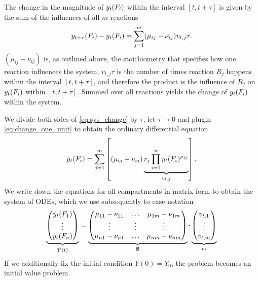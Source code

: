 The change in the magnitude of $y_t(F_i)$ within the interval $[t, t+\tau]$ is given by the sum of the influences of all $m$ reactions
\begin{align}
\label{eq:sys_change}
y_{t+\tau}(F_i) - y_t(F_i) = \sum_{j=1}^m (\mu_{ij} - \nu_{ij}) v_{t,j} \tau.
\end{align}
$(\mu_{ij} - \nu_{ij})$ is, as outlined above, the stoichiometry that specifies how one reaction influences the system, $v_{t,j} \tau$ is the number of times reaction $R_j$ happens within the interval $[t, t+\tau]$, and therefore the product is the influence of $R_j$ on $y_t(F_i)$ within $[t, t+\tau]$. Summed over all reactions yields the change of $y_t(F_i)$ within the system. 

We divide both sides of \eqref{eq:sys_change} by $\tau$, let $\tau \to 0$ and plugin \eqref{eq:change_one_unit} to obtain the ordinary differential equation
\begin{align}
\dot{y}_t(F_i) = \sum_{j=1}^m \left[(\mu_{ij} - \nu_{ij}) \underbrace{r_j  \prod_{i=1}^n y_t(F_i)^{\mu_{ij}}}_{v_{t,j}} \right].
\end{align}
We write down the equations for all compartments in matrix form to obtain the system of ODEs, which we use subsequently to ease notation
\begin{align}
\label{eq:ode_system_matrix}
\underbrace{\begin{pmatrix}
\dot{y}_t(F_1) \\ \vdots \\ \dot{y}_t(F_n) \end{pmatrix}}_{\dot{Y}(t)} =
\underbrace{\begin{pmatrix}
\mu_{11} - \nu_{11} & \hdots & \mu_{1m} - \nu_{1m} \\
\vdots & \vdots & \vdots \\
\mu_{n1} - \nu_{n1} & \hdots & \mu_{nm} - \nu_{nm} \\
\end{pmatrix}}_{\mathbf{S}} \cdot
\underbrace{\begin{pmatrix}
v_{t,1} \\ \vdots \\ v_{t,m}
\end{pmatrix}}_{v_t}
\end{align}
If we additionally fix the initial condition $Y(0) = Y_0$, the problem becomes an initial value problem. 
